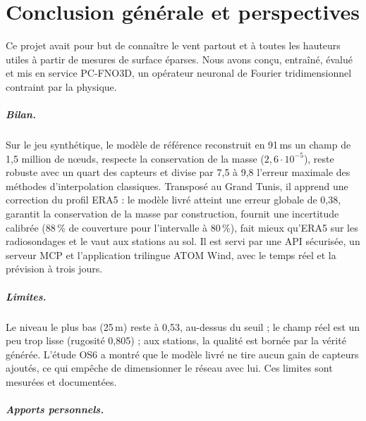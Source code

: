 \chapter*{Conclusion générale et perspectives}

Ce projet avait pour but de connaître le vent partout et à toutes les hauteurs utiles à partir de
mesures de surface éparses. Nous avons conçu, entraîné, évalué et mis en service PC-FNO3D, un
opérateur neuronal de Fourier tridimensionnel contraint par la physique.

\paragraph{Bilan.}
Sur le jeu synthétique, le modèle de référence reconstruit en 91\,ms un champ de 1,5 million de
nœuds, respecte la conservation de la masse ($2{,}6\cdot10^{-5}$), reste robuste avec un quart
des capteurs et divise par 7,5 à 9,8 l'erreur maximale des méthodes d'interpolation classiques.
Transposé au Grand Tunis, il apprend une correction du profil ERA5 : le modèle livré atteint une
erreur globale de 0,38\ms, garantit la conservation de la masse par construction, fournit une
incertitude calibrée (88\,\% de couverture pour l'intervalle à 80\,\%), fait mieux qu'ERA5 sur les
radiosondages et le vaut aux stations au sol. Il est servi par une API sécurisée, un serveur MCP
et l'application trilingue ATOM Wind, avec le temps réel et la prévision à trois jours.

\paragraph{Limites.}
Le niveau le plus bas (25\,m) reste à 0,53\ms, au-dessus du seuil ; le champ réel est un peu trop
lisse (rugosité 0,805) ; aux stations, la qualité est bornée par la vérité générée. L'étude OS6 a
montré que le modèle livré ne tire aucun gain de capteurs ajoutés, ce qui empêche de dimensionner
le réseau avec lui. Ces limites sont mesurées et documentées.

\paragraph{Apports personnels.}

